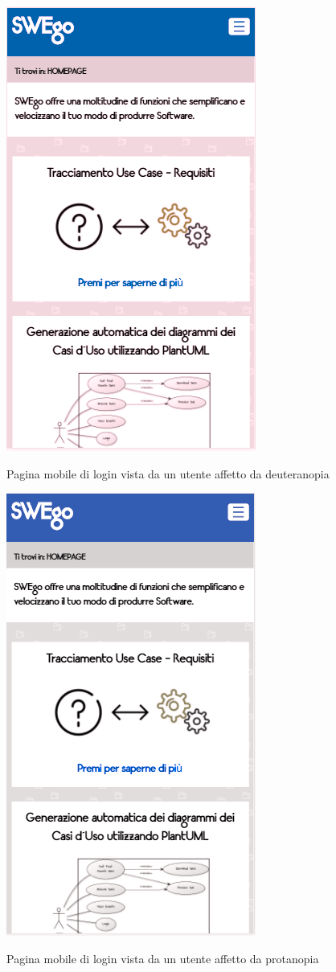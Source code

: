 	\begin{figure}
	\centering
		\includegraphics[scale=0.8]{img/deuteranopia_mobile.png}\\[1cm] \caption{Pagina mobile di login vista da un utente affetto da deuteranopia}
	\end{figure}
	\begin{figure}
	\centering
		\includegraphics[scale=0.8]{img/protanopia_mobile.png}\\[1cm] \caption{Pagina mobile di login vista da un utente affetto da protanopia}
	\end{figure}
